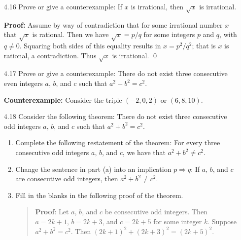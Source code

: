 \begin{enumerate}
\begin{enumerate}
      \end{enumerate} 
   \item[4.16] Prove or give a counterexample: If $x$ is irrational, then
               $\sqrt{x}$ is irrational.

      \textbf{Proof:} Assume by way of contradiction that for some irrational
      number $x$ that $\sqrt{x}$ is rational. Then we have $\sqrt{x} = p/q$ for
      some integers $p$ and $q$, with $q \neq 0$. Squaring both sides of this
      equality results in $x = p^2/q^2$; that is $x$ is rational, a
      contradiction. Thus $\sqrt{x}$ is irrational. \qed
   \item[4.17] Prove or give a counterexample: There do not exist three
               consecutive even integers $a$, $b$, and $c$ such that
               $a^2 + b^2 = c^2$.

      \textbf{Counterexample:} Consider the triple $(-2, 0, 2)$ or $(6, 8, 10)$.
   \item[4.18] Consider the following theorem: There do not exist three
               consecutive odd integers $a$, $b$, and $c$ such that
               $a^2 + b^2 = c^2$.
               \begin{enumerate}
                  \item Complete the following restatement of the theorem: For
                        every three consecutive odd integers $a$, $b$, and $c$,
                        we have that $a^2 + b^2 \neq c^2$.
                  \item Change the sentence in part (a) into an implication
                        $p \Rightarrow q$: If $a$, $b$, and $c$ are consecutive
                        odd integers, then $a^2 + b^2 \neq c^2$.
                  \item Fill in the blanks in the following proof of the
                        theorem.
                        \begin{quote}
                           \textbf{Proof}: Let $a$, $b$, and $c$ be consecutive
                           odd integers. Then $a = 2k + 1$, $b = 2k + 3$, and
                           $c = 2k + 5$ for some integer $k$. Suppose
                           $a^2 + b^2 = c^2$. Then
                           $(2k + 1)^2 + (2k + 3)^2 = (2k + 5)^2$.


\end{quote}
\end{enumerate}
\end{enumerate}
